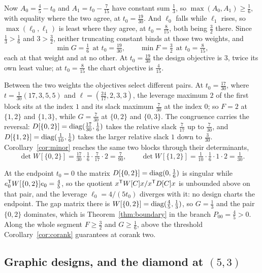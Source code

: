 \begin{example}
Now $A_0=\tfrac45-t_0$ and $A_1=t_0-\tfrac7{15}$ have constant sum
$\tfrac13$, so $\max(A_0,A_1)\ge\tfrac16$, with equality where the two
agree, at $t_0=\tfrac{19}{30}$.  And $\ell_0$ falls while $\ell_1$ rises,
so $\max(\ell_0,\ell_1)$ is least where they agree, at $t_0=\tfrac8{15}$,
both being $\tfrac32$ there.  Since $\tfrac13>\tfrac16$ and $3>\tfrac32$,
neither truncating constant binds at those two weights, and
\[
  \min G=\tfrac16\ \ \text{at }t_0=\tfrac{19}{30},
  \qquad
  \min F=\tfrac32\ \ \text{at }t_0=\tfrac8{15},
\]
each at that weight and at no other.  At $t_0=\tfrac{19}{30}$ the design
objective is $3$, twice its own least value; at $t_0=\tfrac8{15}$ the
chart objective is $\tfrac4{15}$.

Between the two weights the objectives select different pairs.  At
$t_0=\tfrac{17}{30}$, where $t=\tfrac1{30}(17,3,5,5)$ and
$\ell=(\tfrac{24}{17},2,3,3)$, the leverage maximum $2$ of the first
block sits at the index $1$ and its slack maximum $\tfrac7{30}$ at the
index $0$; so $F=2$ at $\{1,2\}$ and $\{1,3\}$, while $G=\tfrac7{30}$ at
$\{0,2\}$ and $\{0,3\}$.  The congruence carries the reversal:
$D[\{0,2\}]=\operatorname{diag}(\tfrac{17}{30},\tfrac16)$ takes the relative slack
$\tfrac7{17}$ up to $\tfrac7{30}$, and
$D[\{1,2\}]=\operatorname{diag}(\tfrac1{10},\tfrac16)$ takes the larger relative slack
$1$ down to $\tfrac3{30}$.  Corollary~\ref{cor:minor} reaches the same
two blocks through their determinants,
\[
  \det W[\{0,2\}]
    =\tfrac{17}{30}\cdot\tfrac16\cdot\tfrac7{17}\cdot2=\tfrac7{90},
  \qquad
  \det W[\{1,2\}]=\tfrac1{10}\cdot\tfrac16\cdot1\cdot2=\tfrac1{30} .
\]

At the endpoint $t_0=0$ the matrix $D[\{0,2\}]=\operatorname{diag}(0,\tfrac16)$ is
singular while $e_0^{\mathsf{T}} W[\{0,2\}]e_0=\tfrac45$, so the quotient
$x^{\mathsf{T}} W[C]x/x^{\mathsf{T}} D[C]x$ is unbounded above on that pair, and the leverage
$\ell_0=4/(5t_0)$ diverges with it: no design charts the endpoint.  The
gap matrix there is $W[\{0,2\}]=\operatorname{diag}(\tfrac45,\tfrac13)$, so
$G=\tfrac13$ and the pair $\{0,2\}$ dominates, which is
Theorem~\ref{thm:boundary} in the branch $P_{00}=\tfrac45>0$.  Along the
whole segment $F\ge\tfrac32$ and $G\ge\tfrac16$, above the threshold
Corollary~\ref{cor:corank} guarantees at corank two.
\end{example}

\subsection{Graphic designs, and the diamond at
\texorpdfstring{$(5,3)$}{(5,3)}}\label{app:diamond}

